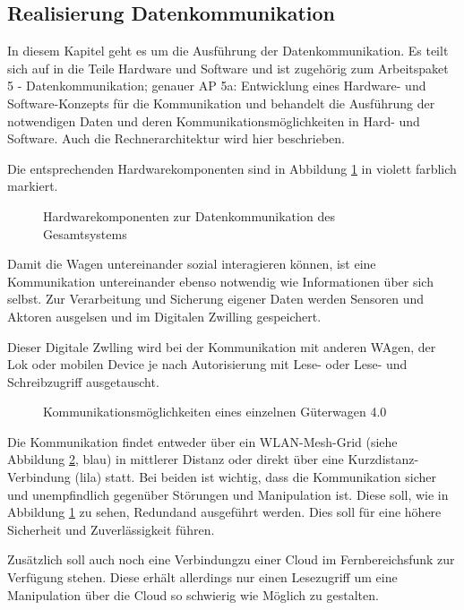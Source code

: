 \subsection{Realisierung Datenkommunikation}\label{sec:dKomp}
In diesem Kapitel geht es um die Ausführung der Datenkommunikation. Es teilt sich auf in die Teile Hardware und Software und ist zugehörig zum Arbeitspaket 5 - Datenkommunikation; genauer AP 5a: Entwicklung eines Hardware- und Software-Konzepts für die Kommunikation und behandelt die Ausführung der notwendigen Daten und deren Kommunikationsmöglichkeiten in Hard- und Software.  Auch die Rechnerarchitektur wird hier beschrieben.\par
Die entsprechenden Hardwarekomponenten sind in Abbildung \ref{fig:dKomp} in violett farblich markiert.
\begin{figure}[hbt]
    \centering
    
    \caption{Hardwarekomponenten zur Datenkommunikation des Gesamtsystems}
    \label{fig:dKomp}
\end{figure}
Damit die Wagen untereinander sozial interagieren können, ist eine Kommunikation untereinander ebenso notwendig wie Informationen über sich selbst. Zur Verarbeitung und Sicherung eigener Daten werden Sensoren und Aktoren ausgelsen und im Digitalen Zwilling gespeichert.\par
Dieser Digitale Zwlling wird bei der Kommunikation mit anderen WAgen, der Lok oder mobilen Device je nach Autorisierung mit Lese- oder Lese- und Schreibzugriff ausgetauscht.\par
\begin{figure}[hbt]
    \centering
    
    \caption{Kommunikationsmöglichkeiten eines einzelnen Güterwagen 4.0\cite{autonBetrieb}}
    \label{fig:Wagenkomm}
\end{figure}
Die Kommunikation findet entweder über ein WLAN-Mesh-Grid (siehe Abbildung \ref{fig:Wagenkomm}, blau) in mittlerer Distanz oder direkt über eine Kurzdistanz-Verbindung (lila) statt. Bei beiden ist wichtig, dass die Kommunikation sicher und unempfindlich gegenüber Störungen und Manipulation ist. Diese soll, wie in Abbildung \ref{fig:dKomp} zu sehen, Redundand ausgeführt werden. Dies soll für eine höhere Sicherheit und Zuverlässigkeit führen. \par
Zusätzlich soll auch noch eine Verbindungzu einer Cloud im Fernbereichsfunk zur Verfügung stehen. Diese erhält allerdings nur einen Lesezugriff um eine Manipulation über die Cloud so schwierig wie Möglich zu gestalten.\par
